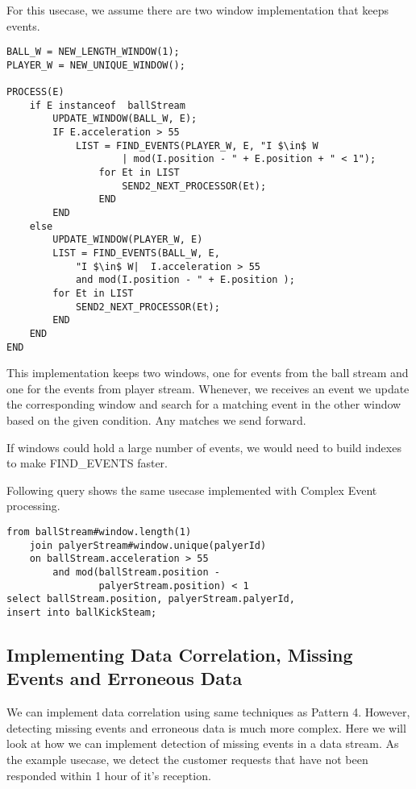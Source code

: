 \documentclass{sig-alternate}
\begin{document}
{For this usecase, we assume there are two window implementation that keeps events. 

\begin{lstlisting}[mathescape, showstringspaces=false]
BALL_W = NEW_LENGTH_WINDOW(1); 
PLAYER_W = NEW_UNIQUE_WINDOW();

PROCESS(E)
	if E instanceof  ballStream
		UPDATE_WINDOW(BALL_W, E);
		IF E.acceleration > 55
    		LIST = FIND_EVENTS(PLAYER_W, E, "I $\in$ W
    				| mod(I.position - " + E.position + " < 1");
				for Et in LIST
					SEND2_NEXT_PROCESSOR(Et);
				END	
		END
	else
		UPDATE_WINDOW(PLAYER_W, E)
		LIST = FIND_EVENTS(BALL_W, E,
			"I $\in$ W|  I.acceleration > 55
			and mod(I.position - " + E.position );
		for Et in LIST
			SEND2_NEXT_PROCESSOR(Et);
		END
	END
END  
\end{lstlisting}


 

This implementation keeps two windows, one for events from the ball stream and one for the events from player stream. Whenever, we receives an event we update the corresponding window and search for a matching event in the other window based on the given condition. Any matches we send forward. 

If windows could hold a large number of events, we would need to build indexes to make FIND\_EVENTS faster. 

Following query shows the same usecase implemented with Complex Event processing.  


\begin{lstlisting}[mathescape]
from ballStream#window.length(1) 
	join palyerStream#window.unique(palyerId)
	on ballStream.acceleration > 55 
		and mod(ballStream.position - 
				palyerStream.position) < 1
select ballStream.position, palyerStream.palyerId,
insert into ballKickSteam;
\end{lstlisting}



\subsection{Implementing Data Correlation, Missing Events and Erroneous Data}

We can implement data correlation using same techniques as Pattern 4. However, detecting missing events and erroneous data is much more complex. Here we will look at how we can implement detection of missing events in a data stream. As the example usecase, we detect the customer requests that have not been responded within 1 hour of it's reception.  


}
\end{document}

